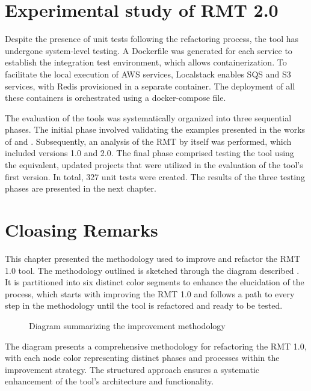 \section{Experimental study of RMT 2.0}
\label{sec-test-rmt}

Despite the presence of unit tests following the refactoring process, the tool has undergone system-level testing. A Dockerfile was generated for each service to establish the integration test environment, which allows containerization. To facilitate the local execution of AWS services, Localstack \cite{localstack} enables SQS and S3 services, with Redis provisioned in a separate container. The deployment of all these containers is orchestrated using a docker-compose file. 

The evaluation of the tools was systematically organized into three sequential phases. The initial phase involved validating the examples presented in the works of \textcite{Liu2014} and \cite{zafeiris2017automated}. Subsequently, an analysis of the RMT by itself was performed, which included versions 1.0 and 2.0. The final phase comprised testing the tool using the equivalent, updated projects that were utilized in the evaluation of the tool's first version. In total, 327 unit tests were created. The results of the three testing phases are presented in the next chapter.

\section{Cloasing Remarks}

This chapter presented the methodology used to improve and refactor the RMT 1.0 tool. 
The methodology outlined is sketched through the diagram described . It is partitioned into six distinct color segments to enhance the elucidation of the process, which starts with improving the RMT 1.0 and follows a path to every step in the methodology until the tool is refactored and ready to be tested.

\begin{figure}[ht!]
\SetCaptionWidth{\textwidth}
\caption{Diagram summarizing the improvement methodology}
\label{fig-summarized-methodology}
\fontsize{3.8}{5}\selectfont

\end{figure}
\FloatBarrier

The diagram presents a comprehensive methodology for refactoring the RMT 1.0, with each node color representing distinct phases and processes within the improvement strategy. The structured approach ensures a systematic enhancement of the tool's architecture and functionality.

